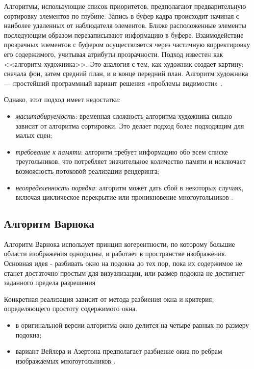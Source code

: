 Алгоритмы, использующие список приоритетов, предполагают предварительную сортировку элементов по глубине. Запись в буфер кадра происходит начиная с наиболее удаленных от наблюдателя элементов. Ближе расположенные элементы последующим образом перезаписывают информацию в буфере. Взаимодействие прозрачных элементов с буфером осуществляется через частичную корректировку его содержимого, учитывая атрибуты прозрачности. Подход известен как <<алгоритм художника>>. Это аналогия с тем, как художник создает картину: сначала фон, затем средний план, и в конце передний план. Алгоритм художника --- простейший программный вариант решения «проблемы видимости» \cite{light, del_line}. 

Однако, этот подход имеет недостатки:
\begin{itemize}
\item \textit{масштабируемость:} временная сложность алгоритма художника сильно зависит от алгоритма сортировки. Это делает подход более подходящим для малых сцен;
\item \textit{требование к памяти}: алгоритм требует информацию обо всем списке треугольников, что потребляет значительное количество памяти и исключает возможность потоковой реализации рендеринга;
\item \textit{неопределенность порядка}: алгоритм может дать сбой в некоторых случаях, включая циклическое перекрытие или проникновение многоугольников \cite{light}.
\end{itemize}

\subsection{Алгоритм Варнока}

Алгоритм Варнока использует принцип когерентности, по которому большие области изображения однородны, и работает в пространстве изображения. Основная идея - разбивать окно на подокна до тех пор, пока их содержимое не станет достаточно простым для визуализации, или размер подокна не достигнет заданного предела разрешения \cite{del_line, varnok}

Конкретная реализация зависит от метода разбиения окна и 
критерия, определяющего простоту содержимого окна.
\begin{itemize}
\item в оригинальной версии алгоритма окно делится на четыре равных по размеру подокна;
\item вариант Вейлера и Азертона предполагает разбиение окна по ребрам изображаемых многоугольников \cite{varnok}.
\end{itemize}

